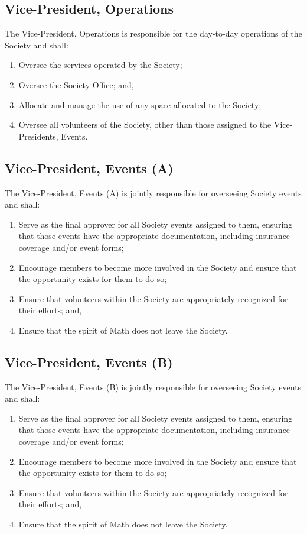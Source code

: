 \subsection{Vice-President, Operations}
The Vice-President, Operations is responsible for the day-to-day operations of
the Society and shall:
\begin{enumerate}
  \item Oversee the services operated by the Society;
  \item Oversee the Society Office; and,
    \item Allocate and manage the use of any space allocated to the Society;
    \item Oversee all volunteers of the Society, other than those assigned to the
        Vice-Presidents, Events.
\end{enumerate}

\subsection{Vice-President, Events (A)}
The Vice-President, Events (A) is jointly responsible for overseeing Society
events and shall:
\begin{enumerate}
    \item Serve as the final approver for all Society events assigned to them,
            ensuring that those events have the appropriate documentation, including
            insurance coverage and/or event forms;
    \item Encourage members to become more involved in the Society and ensure
            that the opportunity exists for them to do so;
    \item Ensure that volunteers within the Society are appropriately recognized
            for their efforts; and,
    \item Ensure that the spirit of Math does not leave the Society.
\end{enumerate}

\subsection{Vice-President, Events (B)}
The Vice-President, Events (B) is jointly responsible for overseeing Society
events and shall:
\begin{enumerate}
    \item Serve as the final approver for all Society events assigned to them,
            ensuring that those events have the appropriate documentation, including
            insurance coverage and/or event forms;
    \item Encourage members to become more involved in the Society and ensure
            that the opportunity exists for them to do so;
    \item Ensure that volunteers within the Society are appropriately recognized
            for their efforts; and,
    \item Ensure that the spirit of Math does not leave the Society.
\end{enumerate}

